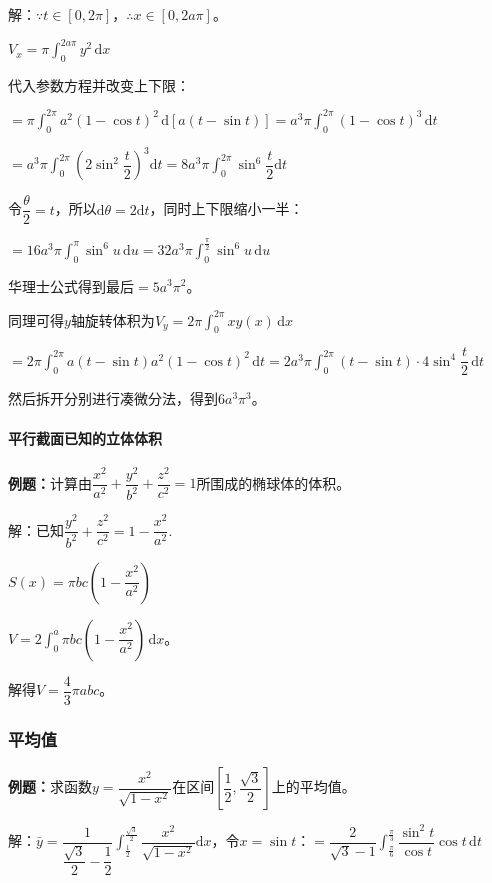 \documentclass[UTF8, 12pt]{ctexart}
\begin{document}
解：$\because t\in[0,2\pi]$，$\therefore x\in[0,2a\pi]$。

$V_x=\pi\int_0^{2a\pi}y^2\,\textrm{d}x$

代入参数方程并改变上下限：

$=\pi\int_0^{2\pi}a^2(1-\cos t)^2\,\textrm{d}[a(t-\sin t)]=a^3\pi\int_0^{2\pi}(1-\cos t)^3\,\textrm{d}t$

$=a^3\pi\displaystyle{\int_0^{2\pi}\left(2\sin^2\dfrac{t}{2}\right)^3\textrm{d}t}=8a^3\pi\displaystyle{\int_0^{2\pi}\sin^6\dfrac{t}{2}\textrm{d}t}$

令$\dfrac{\theta}{2}=t$，所以$\textrm{d}\theta=2\textrm{d}t$，同时上下限缩小一半：

$=16a^3\pi\int_0^\pi\sin^6u\,\textrm{d}u=32a^3\pi\int_0^{\frac{\pi}{2}}\sin^6u\,\textrm{d}u$

华理士公式得到最后$=5a^3\pi^2$。

同理可得$y$轴旋转体积为$V_y=2\pi\int_0^{2\pi}xy(x)\,\textrm{d}x$

$=2\pi\int_0^{2\pi}a(t-\sin t)a^2(1-\cos t)^2\,\textrm{d}t=2a^3\pi\int_0^{2\pi}(t-\sin t)\cdot 4\sin^4\dfrac{t}{2}\,\textrm{d}t$

然后拆开分别进行凑微分法，得到$6a^3\pi^3$。

\paragraph{平行截面已知的立体体积} \leavevmode \medskip

\textbf{例题：}计算由$\dfrac{x^2}{a^2}+\dfrac{y^2}{b^2}+\dfrac{z^2}{c^2}=1$所围成的椭球体的体积。

解：已知$\dfrac{y^2}{b^2}+\dfrac{z^2}{c^2}=1-\dfrac{x^2}{a^2}$.

$S(x)=\pi bc\left(1-\dfrac{x^2}{a^2}\right)$

$V=2\int_0^a\pi bc\left(1-\dfrac{x^2}{a^2}\right)\,\textrm{d}x$。

解得$V=\dfrac{4}{3}\pi abc$。

\subsubsection{平均值}

\textbf{例题：}求函数$y=\dfrac{x^2}{\sqrt{1-x^2}}$在区间$\left[\dfrac{1}{2},\dfrac{\sqrt{3}}{2}\right]$上的平均值。

解：$\bar{y}=\dfrac{1}{\dfrac{\sqrt{3}}{2}-\dfrac{1}{2}}\displaystyle{\int_\frac{1}{2}^\frac{\sqrt{3}}{2}\dfrac{x^2}{\sqrt{1-x^2}}\textrm{d}x}$，令$x=\sin t$：$=\dfrac{2}{\sqrt{3}-1}\displaystyle{\int_\frac{\pi}{6}^\frac{\pi}{3}\dfrac{\sin^2t}{\cos t}\cos t\,\textrm{d}t}$ \medskip
\end{document}
